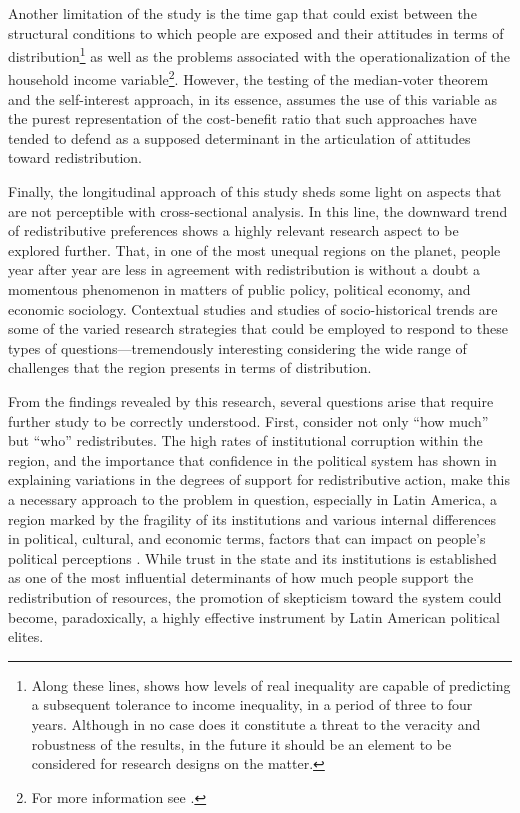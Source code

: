 \documentclass[utf8]{frontiersSCNS} %
\begin{document}
Another limitation of the study is the time gap that could exist between the structural conditions to which people are exposed and their attitudes in terms of distribution\footnote{Along these lines, \textcite{SchroderIncomeInequalityRelated2017} shows how levels of real inequality are capable of predicting a subsequent tolerance to income inequality, in a period of three to four years. Although in no case does it constitute a threat to the veracity and robustness of the results, in the future it should be an element to be considered for research designs on the matter.}  as well as the problems associated with the operationalization of the household income variable\footnote{For more information see \textcite{FeresNotassobremedicion1997}.}. However, the testing of the median-voter theorem and the self-interest approach, in its essence, assumes the use of this variable as the purest representation of the cost-benefit ratio that such approaches have tended to defend as a supposed determinant in the articulation of attitudes toward redistribution.

Finally, the longitudinal approach of this study sheds some light on aspects that are not perceptible with cross-sectional analysis. In this line, the downward trend of redistributive preferences shows a highly relevant research aspect to be explored further. That, in one of the most unequal regions on the planet, people year after year are less in agreement with redistribution is without a doubt a momentous phenomenon in matters of public policy, political economy, and economic sociology. Contextual studies and studies of socio-historical trends are some of the varied research strategies that could be employed to respond to these types of questions—tremendously interesting considering the wide range of challenges that the region presents in terms of distribution.

From the findings revealed by this research, several questions arise that require further study to be correctly understood. First, consider not only “how much” but “who” redistributes. The high rates of institutional corruption within the region, and the importance that confidence in the political system has shown in explaining variations in the degrees of support for redistributive action, make this a necessary approach to the problem in question, especially in Latin America, a region marked by the fragility of its institutions \parencite{portes2010institutions} and various internal differences in political, cultural, and economic terms, factors that can impact on people’s political perceptions \parencite{Stevens2016}. While trust in the state and its institutions is established as one of the most influential determinants of how much people support the redistribution of resources, the promotion of skepticism toward the system could become, paradoxically, a highly effective instrument by Latin American political elites.
\end{document}
